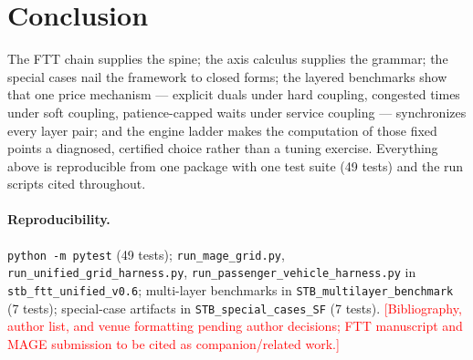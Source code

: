 \documentclass[11pt]{article}
\newcommand{\red}[1]{\textcolor{red}{#1}}
\newcommand{\code}[1]{\texttt{#1}}
\begin{document}
\section{Conclusion}

The FTT chain supplies the spine; the axis calculus supplies the
grammar; the special cases nail the framework to closed forms; the
layered benchmarks show that one price mechanism --- explicit duals
under hard coupling, congested times under soft coupling, patience-capped
waits under service coupling --- synchronizes every layer pair; and the
engine ladder makes the computation of those fixed points a diagnosed,
certified choice rather than a tuning exercise. Everything above is
reproducible from one package with one test suite (49 tests) and the
run scripts cited throughout.

\paragraph{Reproducibility.} \code{python -m pytest} (49 tests);
\code{run\_mage\_grid.py}, \code{run\_unified\_grid\_harness.py},
\code{run\_passenger\_vehicle\_harness.py} in
\code{stb\_ftt\_unified\_v0.6}; multi-layer benchmarks in
\code{STB\_multilayer\_benchmark} (7 tests); special-case artifacts in
\code{STB\_special\_cases\_SF} (7 tests). \red{[Bibliography, author
list, and venue formatting pending author decisions; FTT manuscript and
MAGE submission to be cited as companion/related work.]}
\end{document}
